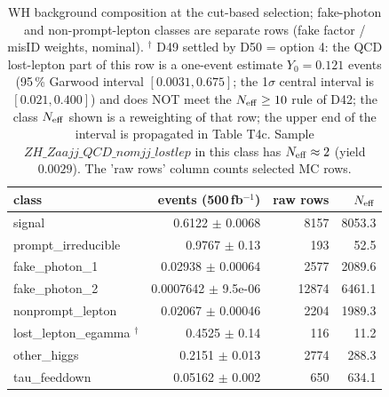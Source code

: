 \begin{table}[ht]\centering\small
\begin{tabular}{lrrr}\hline
class & events (500\,fb$^{-1}$) & raw rows & $N_{\rm eff}$ \\\hline
signal & 0.6122 $\pm$ 0.0068 & 8157 & 8053.3 \\
prompt\_irreducible & 0.9767 $\pm$ 0.13 & 193 & 52.5 \\
fake\_photon\_1 & 0.02938 $\pm$ 0.00064 & 2577 & 2089.6 \\
fake\_photon\_2 & 0.0007642 $\pm$ 9.5e-06 & 12874 & 6461.1 \\
nonprompt\_lepton & 0.02067 $\pm$ 0.00046 & 2204 & 1989.3 \\
lost\_lepton\_egamma $^\dagger$ & 0.4525 $\pm$ 0.14 & 116 & 11.2 \\
other\_higgs & 0.2151 $\pm$ 0.013 & 2774 & 288.3 \\
tau\_feeddown & 0.05162 $\pm$ 0.002 & 650 & 634.1 \\\hline
\end{tabular}
\caption{WH background composition at the cut-based selection; fake-photon and non-prompt-lepton classes are separate rows (fake factor / misID weights, nominal). $^\dagger$ D49 settled by D50 = option 4: the QCD lost-lepton part of this row is a one-event estimate $Y_0=0.121$ events (95\,\% Garwood interval $[0.0031,0.675]$; the 1$\sigma$ central interval is $[0.021,0.400]$) and does NOT meet the $N_{\rm eff}\ge10$ rule of D42; the class $N_{\rm eff}$ shown is a reweighting of that row; the upper end of the interval is propagated in Table T4c. Sample $ZH\_Zaajj\_QCD\_nomjj\_lostlep$ in this class has $N_{\rm eff}\approx2$ (yield $0.0029$). The 'raw rows' column counts selected MC rows.}
\end{table}
